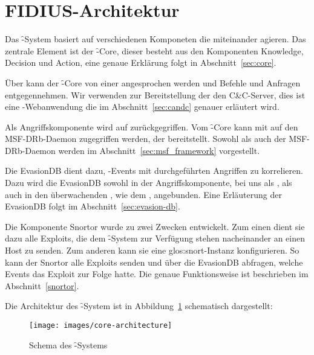 \section{FIDIUS-Architektur}
\label{sec:architecture}
\authors{\LM \and \DE}{}

Das \f-System basiert auf verschiedenen Komponeten die miteinander agieren.
Das zentrale Element ist der \f-Core, dieser besteht aus den Komponenten
Knowledge, Decision und Action, eine genaue Erklärung folgt in
Abschnitt~\ref{sec:core}.

Über  kann der \f-Core von einer  angesprochen werden
und Befehle und Anfragen entgegennehmen. Wir verwenden zur Bereitstellung
der  den C\&C-Server, dies ist eine -Webanwendung die
im Abschnitt~\ref{sec:candc} genauer erläutert wird.

Als Angriffskomponente wird auf  zurückgegriffen. Vom \f-Core
kann mit  auf den MSF-DRb-Daemon zugegriffen werden, der 
bereitstellt. Sowohl  als auch der MSF-DRb-Daemon werden im
Abschnitt~\ref{sec:msf_framework} vorgestellt.   

Die EvasionDB dient dazu, -Events mit durchgeführten Angriffen zu
korrelieren. Dazu wird die EvasionDB sowohl in der Angriffskomponente, bei
uns als , als auch in den überwachenden , wie dem
, angebunden. Eine Erläuterung der EvasionDB folgt im
Abschnitt~\ref{sec:evasion-db}.

Die Komponente Snortor wurde zu zwei Zwecken entwickelt. Zum einen
dient sie dazu alle Exploits, die dem \f-System zur Verfügung stehen
nacheinander an einen Host zu senden. Zum anderen kann sie eine
\gls{glos:snort}-Instanz konfigurieren. So kann der Snortor alle Exploits
senden und über die EvasionDB abfragen, welche Events das Exploit
zur Folge hatte. Die genaue Funktionsweise ist beschrieben im
Abschnitt~\ref{snortor}.

Die Architektur des \f-System ist in Abbildung~\ref{fig:core} schematisch dargestellt:

\begin{figure}
  \centering
  \texttt{[image: images/core-architecture]}
  \caption{Schema des \f-Systems}
  \label{fig:core}
\end{figure}
